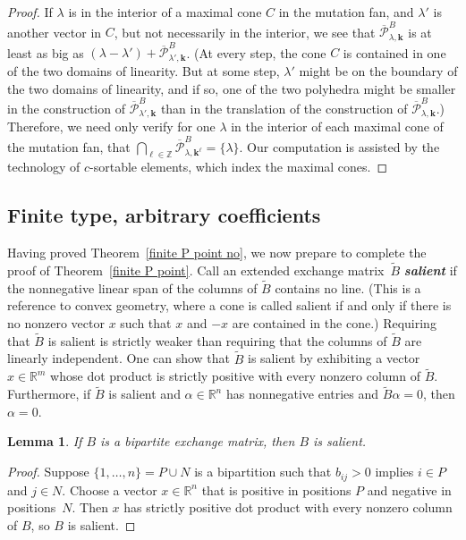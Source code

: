 \documentclass{amsart}
\newtheorem{lemma}[proposition]{Lemma}
\theoremstyle{definition}
\theoremstyle{remark}
\numberwithin{equation}{section}
\newcommand{\newword}[1]{\textbf{\emph{#1}}}
\newcommand{\integers}{\mathbb Z}
\newcommand{\reals}{\mathbb R}
\newcommand{\set}[1]{{\lbrace #1 \rbrace}}
\newcommand{\0}{{\mathbf{0}}}
\newcommand{\kk}{{\boldsymbol{k}}}
\newcommand{\tB}{{\widetilde{B}}}
\renewcommand{\P}{\mathcal{P}}
\begin{document}
\begin{proof}
If $\lambda$ is in the interior of a maximal cone $C$ in the mutation fan, and $\lambda'$ is another vector in $C$, but not necessarily in the interior, we see that $\overline{\P}^B_{\lambda,\kk}$ is at least as big as $(\lambda-\lambda')+\overline{\P}^B_{\lambda',\kk}$.
(At every step, the cone $C$ is contained in one of the two domains of linearity.
But at some step, $\lambda'$ might be on the boundary of the two domains of linearity, and if so, one of the two polyhedra might be smaller in the construction of $\overline{\P}^B_{\lambda',\kk}$ than in the translation of the construction of $\overline{\P}^B_{\lambda,\kk}$.)
Therefore, we need only verify for one $\lambda$ in the interior of each maximal cone of the mutation fan, that $\bigcap_{\ell\in\integers}\overline{\P}^B_{\lambda,\kk^\ell}=\set{\lambda}$.
Our computation is assisted by the technology of $c$-sortable elements, which index the maximal cones.
\end{proof}

\subsection{Finite type, arbitrary coefficients}
Having proved Theorem~\ref{finite P point no}, we now prepare to complete the proof of Theorem~\ref{finite P point}.
Call an extended exchange matrix~$\tB$ \newword{salient} if the nonnegative linear span of the columns of $\tB$ contains no line.
(This is a reference to convex geometry, where a cone is called salient if and only if there is no nonzero vector $x$ such that $x$ and $-x$ are contained in the cone.)
Requiring that $\tB$ is salient is strictly weaker than requiring that the columns of $\tB$ are linearly independent.
One can show that $\tB$ is salient by exhibiting a vector $x\in\reals^m$ whose dot product is strictly positive with every nonzero column of $\tB$.
Furthermore, if $\tB$ is salient and $\alpha\in\reals^n$ has nonnegative entries and $\tB\alpha=0$, then $\alpha=0$.

\begin{lemma}\label{bip sal}
If $B$ is a bipartite exchange matrix, then $B$ is salient.
\end{lemma}
\begin{proof}
Suppose $\set{1,\ldots,n}=P\cup N$ is a bipartition such that $b_{ij}>0$ implies $i\in P$ and $j\in N$.
Choose a vector $x\in\reals^n$ that is positive in positions $P$ and negative in positions~$N$.
Then $x$ has strictly positive dot product with every nonzero column of $B$, so $B$ is salient.
\end{proof}
\end{document}
